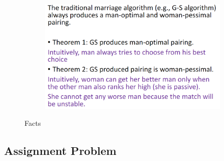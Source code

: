 \begin{figure}[!htb]
\begin{subfigure}{0.309\textwidth}
    \end{subfigure}
    \begin{subfigure}{0.309\textwidth}
        \centering
        \includegraphics[width=\textwidth]{pic/DAA10/Facts3}
    \end{subfigure}
    \caption{Facts}
\end{figure}



\subsection{Assignment Problem}
